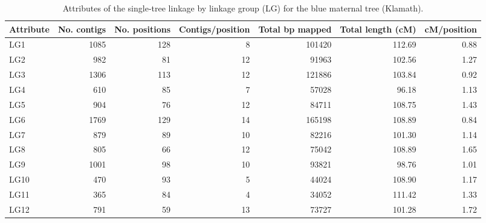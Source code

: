 \documentclass[smallextended]{svjour3}
\begin{document}
\clearpage
\begin{landscape}
\begin{table}[ht]
  \caption{Attributes of the single-tree linkage by linkage group (LG) for the blue maternal tree (Klamath).} 
\begin{tabular}{lrrrrrr}
\toprule
Attribute & No. contigs & No. positions & Contigs/position & Total bp mapped & Total length (cM) & cM/position \\
\midrule
LG1 & 1085 & 128 & 8 & \num{101420} & 112.69 & 0.88 \\
LG2 & 982 & 81 & 12 & \num{91963} & 102.56 & 1.27 \\
LG3 & 1306 & 113 & 12 & \num{121886} & 103.84 & 0.92 \\
LG4 & 610 & 85 & 7 & \num{57028} & 96.18 & 1.13 \\
LG5 & 904 & 76 & 12 & \num{84711} & 108.75 & 1.43 \\
LG6 & 1769 & 129 & 14 & \num{165198} & 108.89 & 0.84 \\
LG7 & 879 & 89 & 10 & \num{82216} & 101.30 & 1.14 \\
LG8 & 805 & 66 & 12 & \num{75042} & 108.89 & 1.65 \\
LG9 & 1001 & 98 & 10 & \num{93821} & 98.76 & 1.01 \\
LG10 & 470 & 93 & 5 & \num{44024} & 108.90 & 1.17 \\
LG11 & 365 & 84 & 4 & \num{34052} & 111.42 & 1.33 \\
LG12 & 791 & 59 & 13 & \num{73727} & 101.28 & 1.72 \\
\bottomrule
\end{tabular}
\label{t:label}
\end{table}
\end{landscape}
\end{document}
